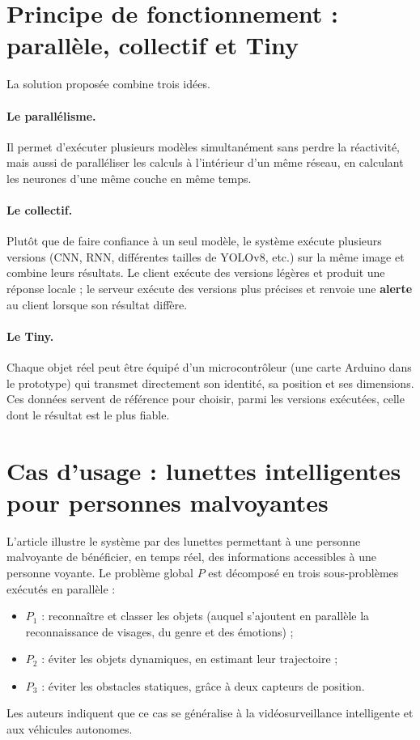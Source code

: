 \documentclass[11pt,a4paper]{report}
\begin{document}
\section{Principe de fonctionnement : parallèle, collectif et Tiny}

La solution proposée combine trois idées.

\paragraph{Le parallélisme.} Il permet d'exécuter plusieurs modèles simultanément sans perdre la réactivité, mais aussi de paralléliser les calculs à l'intérieur d'un même réseau, en calculant les neurones d'une même couche en même temps.

\paragraph{Le collectif.} Plutôt que de faire confiance à un seul modèle, le système exécute plusieurs versions (CNN, RNN, différentes tailles de YOLOv8, etc.) sur la même image et combine leurs résultats. Le client exécute des versions légères et produit une réponse locale ; le serveur exécute des versions plus précises et renvoie une \textbf{alerte} au client lorsque son résultat diffère.

\paragraph{Le Tiny.} Chaque objet réel peut être équipé d'un microcontrôleur (une carte Arduino dans le prototype) qui transmet directement son identité, sa position et ses dimensions. Ces données servent de référence pour choisir, parmi les versions exécutées, celle dont le résultat est le plus fiable.

\section{Cas d'usage : lunettes intelligentes pour personnes malvoyantes}

L'article illustre le système par des lunettes permettant à une personne malvoyante de bénéficier, en temps réel, des informations accessibles à une personne voyante. Le problème global $P$ est décomposé en trois sous-problèmes exécutés en parallèle :
\begin{itemize}
  \item $P_1$ : reconnaître et classer les objets (auquel s'ajoutent en parallèle la reconnaissance de visages, du genre et des émotions) ;
  \item $P_2$ : éviter les objets dynamiques, en estimant leur trajectoire ;
  \item $P_3$ : éviter les obstacles statiques, grâce à deux capteurs de position.
\end{itemize}
Les auteurs indiquent que ce cas se généralise à la vidéosurveillance intelligente et aux véhicules autonomes.
\end{document}
